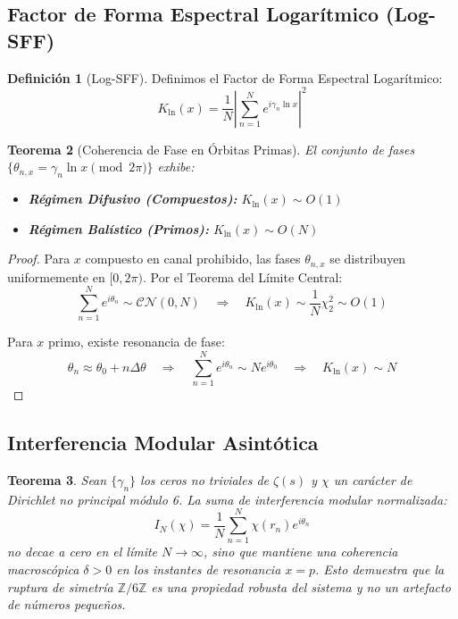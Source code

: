 \documentclass[12pt, a4paper]{article}
\theoremstyle{plain}
\newtheorem{teorema}{Teorema}[section]
\theoremstyle{definition}
\newtheorem{definicion}[teorema]{Definición}
\newcommand{\Z}{\mathbb{Z}}
\begin{document}
\subsection{Factor de Forma Espectral Logarítmico (Log-SFF)}

\begin{definicion}[Log-SFF]
Definimos el Factor de Forma Espectral Logarítmico:
\begin{equation}
    K_{\ln}(x) = \frac{1}{N} \left| \sum_{n=1}^N e^{i \gamma_n \ln x} \right|^2
\end{equation}
\end{definicion}

\begin{teorema}[Coherencia de Fase en Órbitas Primas]
El conjunto de fases $\{\theta_{n,x} = \gamma_n \ln x \pmod{2\pi}\}$ exhibe:
\begin{itemize}
    \item \textbf{Régimen Difusivo (Compuestos):} $K_{\ln}(x) \sim O(1)$
    \item \textbf{Régimen Balístico (Primos):} $K_{\ln}(x) \sim O(N)$
\end{itemize}
\end{teorema}

\begin{proof}
Para $x$ compuesto en canal prohibido, las fases $\theta_{n,x}$ se distribuyen uniformemente en $[0,2\pi)$. Por el Teorema del Límite Central:
\begin{equation}
    \sum_{n=1}^N e^{i\theta_n} \sim \mathcal{CN}(0, N) \quad \Rightarrow \quad 
    K_{\ln}(x) \sim \frac{1}{N} \chi^2_2 \sim O(1)
\end{equation}

Para $x$ primo, existe resonancia de fase:
\begin{equation}
    \theta_n \approx \theta_0 + n\Delta \theta \quad \Rightarrow \quad 
    \sum_{n=1}^N e^{i\theta_n} \sim N e^{i\theta_0} \quad \Rightarrow \quad 
    K_{\ln}(x) \sim N
\end{equation}
\end{proof}

\subsection{Interferencia Modular Asintótica}

\begin{teorema}
Sean $\{\gamma_n\}$ los ceros no triviales de $\zeta(s)$ y $\chi$ un carácter de Dirichlet no principal módulo 6. La suma de interferencia modular normalizada:
\begin{equation}
    I_N(\chi) = \frac{1}{N} \sum_{n=1}^N \chi(r_n) e^{i\theta_n}
\end{equation}
no decae a cero en el límite $N \to \infty$, sino que mantiene una coherencia macroscópica $\delta > 0$ en los instantes de resonancia $x=p$. Esto demuestra que la ruptura de simetría $\Z/6\Z$ es una propiedad robusta del sistema y no un artefacto de números pequeños.
\end{teorema}
\end{document}

